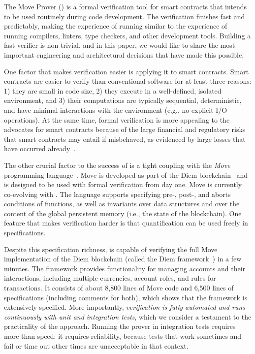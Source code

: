 
The Move Prover (\MVP) is a formal verification tool for smart contracts that
intends to be used routinely during code development.  The verification finishes
fast and predictably, making the experience of running \MVP similar to the
experience of running compilers, linters, type checkers, and other development
tools.  Building a fast verifier is non-trivial, and in this paper, we would
like to share the most important engineering and architectural decisions that
have made this possible.

One factor that makes verification easier is applying it to smart contracts.
Smart contracts are easier to verify than conventional software for at least
three reasons: 1) they are small in code size, 2) they execute in a
well-defined, isolated environment, and 3) their computations are typically
sequential, deterministic, and have minimal interactions with the environment
(e.g., no explicit I/O operations).  At the same time, formal verification is
more appealing to the advocates for smart contracts because of the large
financial and regulatory risks that smart contracts may entail if misbehaved, as
evidenced by large losses that have occurred
already~\cite{CONTRACT_VERIFICATION,hacks-on-smart-contracts,hacks-on-compound}.

The other crucial factor to the success of \MVP is a tight coupling with the
\emph{Move} programming language~\cite{MOVE_LANG}.  Move is developed as part of
the Diem blockchain~\cite{DIEM} and is designed to be used with formal
verification from day one.  Move is currently co-evolving with \MVP.  The
language supports specifying pre-, post-, and aborts conditions of functions, as
well as invariants over data structures and over the content of the global
persistent memory (i.e., the state of the blockchain).  One feature that makes
verification harder is that quantification can be used
freely in specifications.

Despite this specification richness, \MVP is capable of verifying the full Move
implementation of the Diem blockchain (called the Diem
framework~\cite{DIEM_FRAMEWORK}) in a few minutes.  The framework provides
functionality for managing accounts and their interactions, including multiple
currencies, account roles, and rules for transactions.  It consists of about
8,800 lines of Move code and 6,500 lines of specifications (including comments
for both), which shows that the framework is extensively specified.  More
importantly, \emph{verification is fully automated and runs continuously with
  unit and integration tests}, which we consider a testament to the practicality
of the approach.  Running the prover in integration tests requires more than
speed: it requires reliability, because tests that work sometimes and fail or
time out other times are unacceptable in that context.

